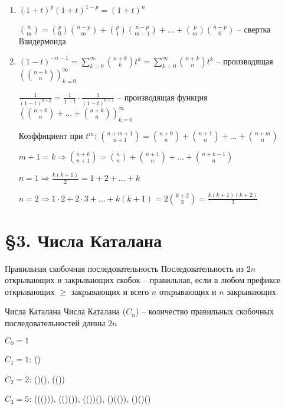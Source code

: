 \documentclass[12pt]{article}
\begin{document}
\begin{Example}{}
\begin{enumerate}
        \item $(1 + t)^p(1 + t)^{1 - p} = ( 1 + t)^n$
        
        ${n \choose m} = {p \choose 0} {n - p \choose m} + {p \choose 1}{n - p \choose m - 1} + \ldots + {p \choose m}{n - p \choose 0}$ -- свертка Вандермонда

        \item $(1 - t)^{-n - 1} = \sum\limits_{k = 0}^\infty {n + k \choose k} t^k = \sum\limits_{k = 0}^\infty {n + k \choose n} t^k$ -- производящая $({n + k \choose n})_{k = 0}^\infty$
        
        $\frac{1}{(1 - t)^{n + 2}} = \frac{1}{1 - t} \cdot \frac{1}{(1 - t)^{n + 1}}$ -- производящая функция $({n + 0 \choose n} + \ldots + {n + k \choose n})_{k = 0}^\infty$

        Коэффициент при $t^m$: ${n + m + 1 \choose n + 1} = {n + 0 \choose n} + {n + 1 \choose n} + \ldots + {n + m \choose n}$

        $m + 1 = k \Rightarrow {n + k \choose n + 1} = {n \choose n} + {n + 1 \choose n} + \ldots + {n + k - 1 \choose n}$

        $n = 1 \Rightarrow \frac{k(k + 1)}{2} = 1 + 2 + \ldots + k$

        $n = 2 \Rightarrow 1 \cdot 2 + 2 \cdot 3 + \ldots + k(k + 1) = 2{ k + 2 \choose 3} = \frac{k(k + 1)(k + 2)}{3}$
    \end{enumerate}
\end{Example}

\newpage 

\section{\S 3. Числа Каталана}

\begin{defin}{Правильная скобочная последовательность}
    Последовательность из $2n$ открывающих и закрывающих скобок -- правильная, если в любом префиксе открывающих $\geq$ закрывающих и всего $n$ открывающих и $n$ закрывающих
\end{defin}

\begin{defin}{Числа Каталана}
    Числа Каталана ($C_n$) -- количество правильных скобочных последовательностей длины $2n$
\end{defin}

\begin{nota}{}
    $C_0 = 1$

    $C_1 = 1$: () 

    $C_2 = 2$: ()(), (())

    $C_3 = 5$: ((())), (()()), (())(), ()(()), ()()()
\end{nota}
\end{document}
